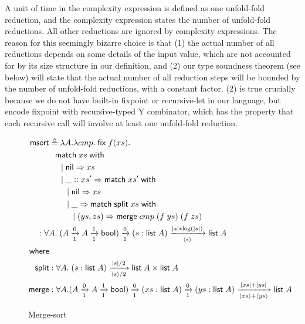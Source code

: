 \documentclass[preprint]{sigplanconf}
\newcommand{\arrow}[4]{#1\xrightarrow[#3]{#2}#4}
\newcommand{\symmatch}{\mathsf{match}}
\newcommand{\symwith}{\mathsf{\;with\;}}
\newcommand{\symlist}{\mathsf{list}}
\newcommand{\symnil}{\mathsf{nil}}
\newcommand{\symfix}{\mathsf{fix}}
\newcommand{\symbool}{\mathsf{bool}}
\newcommand{\symmerge}{\mathsf{merge}}
\newcommand{\intro}[2]{(#1 : #2)}
\newcommand{\symmsort}{\mathsf{msort}}
\newcommand{\symsplit}{\mathsf{split}}
\newcommand{\defeq}{\triangleq}
\newcommand{\Sstats}[1]{\left \langle #1 \right \rangle}
\begin{document}
A unit of time in the complexity expression is defined as one unfold-fold reduction, and the complexity expression states the number of unfold-fold reductions. All other reductions are ignored by complexity expressions. The reason for this seemingly bizarre choice is that (1) the actual number of all reductions depends on some details of the input value, which are not accounted for by its size structure in our definition, and (2) our type soundness theorem (see below) will state that the actual number of all reduction steps will be bounded by the number of unfold-fold reductions, with a constant factor. (2) is true crucially because we do not have built-in fixpoint or recursive-let in our language, but encode fixpoint with recursive-typed Y combinator, which has the property that each recursive call will involve at least one unfold-fold reduction.

\begin{figure}
\begin{align*}
\symmsort &\defeq \lambda A. \lambda cmp.\;\symfix\;f(xs). \\
& \hspace{.1in} \symmatch\;xs\symwith \\
& \hspace{.2in} |\; \symnil\Rightarrow xs \\
& \hspace{.2in} |\; \_::xs' \Rightarrow \symmatch\;xs'\symwith \\
& \hspace{.3in} |\; \symnil\Rightarrow xs \\
& \hspace{.3in} |\; \_ \Rightarrow \symmatch\; \symsplit\;xs \symwith \\
& \hspace{.4in} |\; (ys, zs) \Rightarrow \symmerge\;cmp\;(f\;ys)\;(f\;zs) \\
& \hspace{-0.2in} : \forall A.\;\arrow{(\arrow{A}{0}{1}{\arrow{A}{1}{1}{\symbool}})}{0}{1}{\arrow{\intro{s}{\symlist\;A}}{|s|*\log(|s|)}{\Sstats{s}}{\symlist\;A}} \\
\mathsf{where} & \\
\symsplit &: \forall A.\;\arrow{\intro{s}{\symlist\;A}}{|s|/2}{\Sstats{s}/2}{\symlist\;A\times\symlist\;A} \\
\symmerge &: \forall A.\arrow{(\arrow{A}{0}{1}{\arrow{A}{1}{1}{\symbool}})}{0}{1}{\arrow{\intro{xs}{\symlist\;A}}{0}{1}{\arrow{\intro{ys}{\symlist\;A}}{|xs|+|ys|}{\Sstats{xs}+\Sstats{ys}}{\symlist\;A}}}
\end{align*}
\caption{\label{msort}Merge-sort}
\end{figure}
\end{document}
